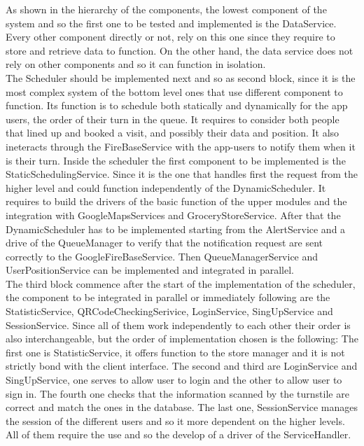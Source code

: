 As shown in the hierarchy of the components, the lowest component of the system and so the first one to be tested and implemented is the DataService. Every other component directly or not, rely on this one since they require to store and retrieve data to function. On the other hand, the data service does not rely on other components and so it can function in isolation. \\
The Scheduler should be implemented next and so as second block, since it is the most complex system of the bottom level ones that use different component to function. Its function is to schedule both statically and dynamically for the app users, the order of their turn in the queue. It requires to consider both people that lined up and booked a visit, and possibly their data and position. It also ineteracts through the FireBaseService with the app-users to notify them when it is their turn.
Inside the scheduler the first component to be implemented is the StaticSchedulingService. Since it is the one that handles first the request from the higher level and could function independently of the DynamicScheduler. It requires to build the drivers of the basic function of the upper modules and the integration with GoogleMapsServices and GroceryStoreService. After that the DynamicScheduler has to be implemented starting from the AlertService and a drive of the QueueManager to verify that the notification request are sent correctly to the GoogleFireBaseService. Then QueueManagerService and UserPositionService can be implemented and integrated in parallel. \\
The third block commence after the start of the implementation of the scheduler, the component to be integrated in parallel or immediately following are the StatisticService, QRCodeCheckingSerivice, LoginService, SingUpService and SessionService. Since all of them work independently to each other their order is also interchangeable, but the order of implementation chosen is the following:
The first one is StatisticService, it offers function to the store manager and it is not strictly bond with the client interface. The second and third are LoginService and SingUpService, one serves to allow user to login and the other to allow user to sign in. The fourth one checks that the information scanned by the turnstile are correct and match the ones in the database. The last one, SessionService manages the session of the different users and so it more dependent on the higher levels. All of them require the use and so the develop of a driver of the ServiceHandler. \\
